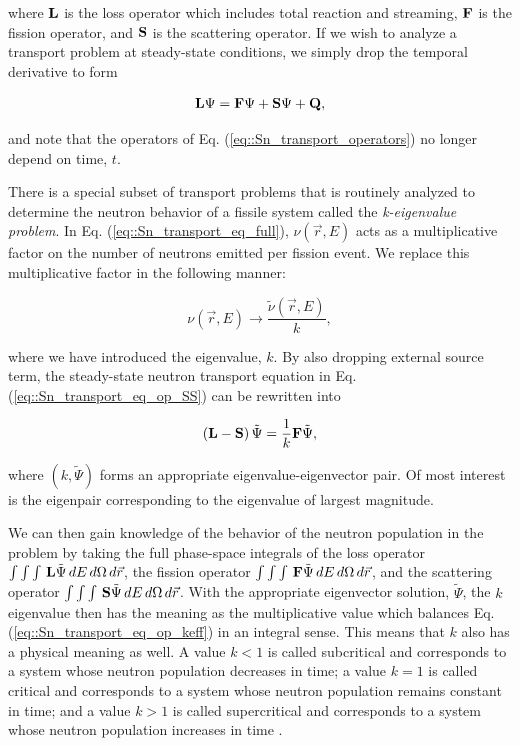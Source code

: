 \noindent where ${\bf L}$ is the loss operator which includes total reaction and streaming, ${\bf F}$ is the fission operator, and ${\bf S}$ is the scattering operator. If we wish to analyze a transport problem at steady-state conditions, we simply drop the temporal derivative to form

\begin{equation}
\label{eq::Sn_transport_eq_op_SS}
	 {\bf L} \Psi =  {\bf F} \Psi  + {\bf S} \Psi + {\bf Q},
\end{equation}

\noindent and note that the operators of Eq. (\ref{eq::Sn_transport_operators}) no longer depend on time, $t$.

There is a special subset of transport problems that is routinely analyzed to determine the neutron behavior of a fissile system called the {\em k-eigenvalue problem}. In Eq. (\ref{eq::Sn_transport_eq_full}), $\nu (\vec{r}, E)$ acts as a multiplicative factor on the number of neutrons emitted per fission event. We replace this multiplicative factor in the following manner:

\begin{equation}
\label{eq::Sn_nubar_k}
	\nu (\vec{r}, E) \rightarrow \frac{\tilde{\nu} (\vec{r}, E)}{k},
\end{equation}

\noindent where we have introduced the eigenvalue, $k$. By also dropping external source term, the steady-state neutron transport equation in Eq. (\ref{eq::Sn_transport_eq_op_SS}) can be rewritten into

\begin{equation}
\label{eq::Sn_transport_eq_op_keff}
	\left( {\bf L}  - {\bf S} \right) \tilde{\Psi} =  \frac{1}{k} {\bf F} \tilde{\Psi} ,
\end{equation}

\noindent where $(k, \tilde{\Psi})$ forms an appropriate eigenvalue-eigenvector pair. Of most interest is the eigenpair corresponding to the eigenvalue of largest magnitude.

We can then gain knowledge of the behavior of the neutron population in the problem by taking the full phase-space integrals of the loss operator $\int  \int \int \, {\bf L} \tilde{\Psi} \, dE \, d\Omega \, d\vec{r}$, the fission operator $\int  \int \int \, {\bf F} \tilde{\Psi} \, dE \, d\Omega \, d\vec{r}$, and the scattering operator $\int  \int \int \, {\bf S} \tilde{\Psi} \, dE \, d\Omega \, d\vec{r}$. With the appropriate eigenvector solution, $\tilde{\Psi}$, the $k$ eigenvalue then has the meaning as the multiplicative value which balances Eq. (\ref{eq::Sn_transport_eq_op_keff}) in an integral sense. This means that $k$ also has a physical meaning as well. A value $k<1$ is called subcritical and corresponds to a system whose neutron population decreases in time; a value $k=1$ is called critical and corresponds to a system whose neutron population remains constant in time; and a value $k>1$ is called supercritical and corresponds to a system whose neutron population increases in time \cite{ott1989}.


